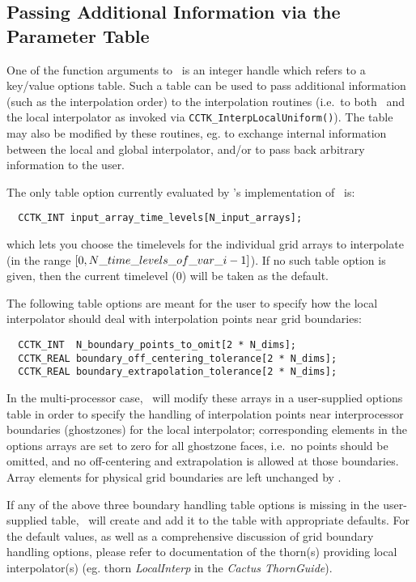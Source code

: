 \documentclass{article}
\begin{document}
\subsection{Passing Additional Information via the Parameter Table}
\label{PUGHInterp_PTable}

One of the function arguments to \InterpGridArrays\ is an integer handle
which refers to a key/value options table. Such a table can be used to pass
additional information (such as the interpolation order) to the interpolation
routines (i.e.\  to both \InterpGridArrays\ and the local interpolator as invoked
via {\tt CCTK\_InterpLocalUniform()}). The table may also be modified by these
routines, eg. to exchange internal information between the local and global
interpolator, and/or to pass back arbitrary information to the user.

The only table option currently evaluated by \PUGHInterp's implementation
of \InterpGridArrays\ is:
\begin{verbatim}
  CCTK_INT input_array_time_levels[N_input_arrays];
\end{verbatim}
which lets you choose the timelevels for the individual grid arrays to
interpolate (in the range $[0, N\_time\_levels\-\_of\_var\_i - 1]$).
If no such table option is given, then the current timelevel (0)
will be taken as the default.

The following table options are meant for the user to specify how the
local interpolator should deal with interpolation points near grid boundaries:
\begin{verbatim}
  CCTK_INT  N_boundary_points_to_omit[2 * N_dims];
  CCTK_REAL boundary_off_centering_tolerance[2 * N_dims];
  CCTK_REAL boundary_extrapolation_tolerance[2 * N_dims];
\end{verbatim}
In the multi-processor case, \InterpGridArrays\ will modify these arrays in
a user-supplied options table in order to specify the handling of interpolation
points near interprocessor boundaries (ghostzones) for the local interpolator;
corresponding elements in the options arrays are set to zero for all ghostzone
faces, i.e.\  no points should be omitted, and no off-centering and extrapolation
is allowed at those boundaries. Array elements for physical grid boundaries are
left unchanged by \InterpGridArrays.

If any of the above three boundary handling table options is missing in the
user-supplied table, \InterpGridArrays\ will create and add it to the table
with appropriate defaults. For the default values, as well as a comprehensive
discussion of grid boundary handling options, please refer to documentation
of the thorn(s) providing local interpolator(s) (eg. thorn {\it LocalInterp} in
the {\it Cactus ThornGuide}).
\end{document}
